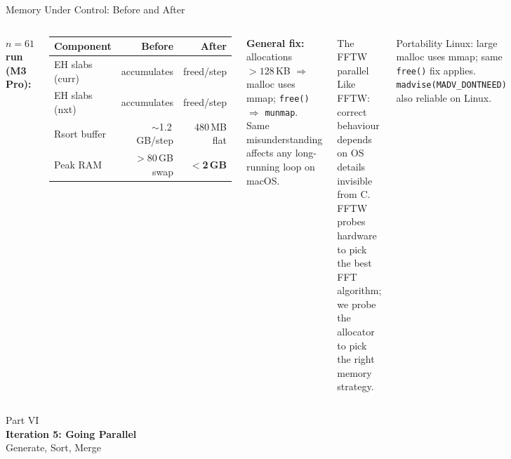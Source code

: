 \documentclass[aspectratio=169,t]{beamer}
\begin{document}
\begin{frame}{Memory Under Control: Before and After}
\small
\begin{columns}[c]
\textbf{$n=61$ run (M3 Pro):}

\vspace{0.1cm}
\begin{center}
\begin{tabular}{lrr}
\toprule
Component & Before & After \\
\midrule
EH slabs (curr) & accumulates & freed/step \\
EH slabs (nxt) & accumulates & freed/step \\
Rsort buffer & $\sim$1.2\,GB/step & 480\,MB flat \\
\midrule
Peak RAM & $>$80\,GB swap & \textbf{$<$2\,GB} \\
\bottomrule
\end{tabular}
\end{center}

\vspace{0.15cm}
\textbf{General fix:} allocations $>128$\,KB $\Rightarrow$ malloc uses mmap; \texttt{free()} $\Rightarrow$ \texttt{munmap}.\\
Same misunderstanding affects any long-running loop on macOS.

\begin{exampleblock}{The FFTW parallel}
  Like FFTW: correct behaviour depends on OS details invisible from C.\\[3pt]
  FFTW probes hardware to pick the best FFT algorithm; we probe the allocator to pick the right memory strategy.
\end{exampleblock}

\vspace{0.1cm}
\begin{block}{Portability}
  Linux: large malloc uses mmap; same \texttt{free()} fix applies.\\
  \texttt{madvise(MADV\_DONTNEED)} also reliable on Linux.
\end{block}
\end{columns}
\end{frame}

{
\begin{frame}[plain]
  \vspace{2cm}
  \begin{center}
    {\color{lightblue}\small Part VI}\\[0.4cm]
    {\color{white}\LARGE\bfseries Iteration 5: Going Parallel}\\[0.3cm]
    {\color{lightblue}\large Generate, Sort, Merge}
  \end{center}
\end{frame}
}
\end{document}

